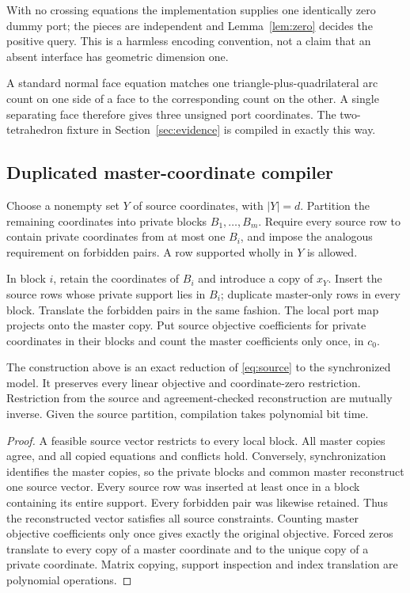 With no crossing equations the implementation supplies one identically zero dummy port; the pieces are independent and Lemma~\ref{lem:zero} decides the positive query. This is a harmless encoding convention, not a claim that an absent interface has geometric dimension one.

A standard normal face equation matches one triangle-plus-quadrilateral arc count on one side of a face to the corresponding count on the other. A single separating face therefore gives three unsigned port coordinates. The two-tetrahedron fixture in Section~\ref{sec:evidence} is compiled in exactly this way.

\subsection{Duplicated master-coordinate compiler}
Choose a nonempty set $Y$ of source coordinates, with $|Y|=d$. Partition the remaining coordinates into private blocks $B_1,\ldots,B_m$. Require every source row to contain private coordinates from at most one $B_i$, and impose the analogous requirement on forbidden pairs. A row supported wholly in $Y$ is allowed.

In block $i$, retain the coordinates of $B_i$ and introduce a copy of $x_Y$. Insert the source rows whose private support lies in $B_i$; duplicate master-only rows in every block. Translate the forbidden pairs in the same fashion. The local port map projects onto the master copy. Put source objective coefficients for private coordinates in their blocks and count the master coefficients only once, in $c_0$.

\begin{theorem}
\label{thm:master-source}
The construction above is an exact reduction of \eqref{eq:source} to the synchronized model. It preserves every linear objective and coordinate-zero restriction. Restriction from the source and agreement-checked reconstruction are mutually inverse. Given the source partition, compilation takes polynomial bit time.
\end{theorem}
\begin{proof}
A feasible source vector restricts to every local block. All master copies agree, and all copied equations and conflicts hold. Conversely, synchronization identifies the master copies, so the private blocks and common master reconstruct one source vector. Every source row was inserted at least once in a block containing its entire support. Every forbidden pair was likewise retained. Thus the reconstructed vector satisfies all source constraints. Counting master objective coefficients only once gives exactly the original objective. Forced zeros translate to every copy of a master coordinate and to the unique copy of a private coordinate. Matrix copying, support inspection and index translation are polynomial operations.
\end{proof}


